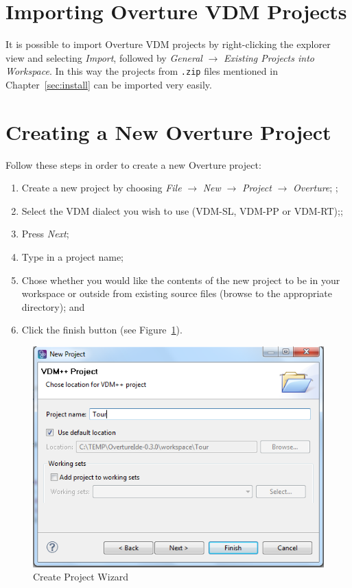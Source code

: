 \documentclass{overturerepchap}
\begin{document}
\section{Importing Overture VDM Projects}\label{subsec:importproj}

It is possible to import Overture VDM projects by
right-clicking the explorer view and selecting \emph{Import}, followed
by \emph{General} $\rightarrow$ \emph{Existing Projects into
  Workspace}.  In this way the projects from \texttt{.zip} files
mentioned in Chapter~\ref{sec:install} can be imported very
easily.  

\section{Creating a New Overture Project}

Follow these steps in order to create a new Overture project:

\begin{enumerate}
	\item Create a new project by choosing \emph{File}
          $\rightarrow$ \emph{New} $\rightarrow$ \emph{Project}
          $\rightarrow$ \emph{Overture}; ;
	\item Select the VDM dialect you wish to use (VDM-SL, VDM-PP
          or VDM-RT);;
	\item Press \emph{Next};
         \item Type in a project name;
	\item Chose whether you would like the contents of the new
          project to be in your workspace or outside from existing
          source files (browse to the appropriate directory); and
         \item Click
	the finish button (see Figure~\ref{fig:CreateProjectWizard}).
\end{enumerate}

\begin{figure}[!htb]
	\begin{center}
	  \includegraphics[scale=0.8]{figures/CreateProjectWizard}
	  \caption[Create Project Wizard]{Create Project Wizard}
	  \label{fig:CreateProjectWizard}
	\end{center}
\end{figure}
\end{document}
